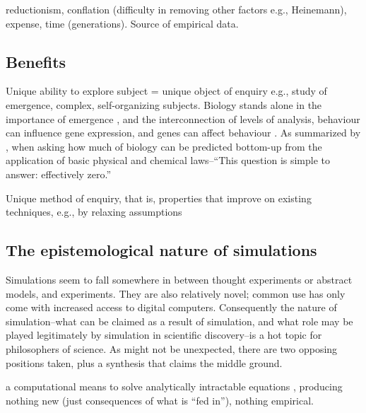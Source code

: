 reductionism, conflation (difficulty in removing other factors e.g.,
Heinemann), expense, time (generations). Source of empirical data.


\subsection{Benefits}\label{benefits}

Unique ability to explore subject = unique object of enquiry e.g., study
of emergence, complex, self-organizing subjects. Biology stands alone in
the importance of emergence \autocite{Bersini:2006ve}, and the
interconnection of levels of analysis, \eg behaviour can influence gene
expression, and genes can affect behaviour \autocite{Krakauer2011}. As
summarized by \autocite{Krakauer2011}, when asking how much of biology
can be predicted bottom-up from the application of basic physical and
chemical laws--``This question is simple to answer: effectively zero.''

Unique method of enquiry, that is, properties that improve on existing
techniques, e.g., by relaxing assumptions

\subsection{The epistemological nature of simulations}\label{the-epistemological-nature-of-simulations}

Simulations seem to fall somewhere in between thought experiments or
abstract models, and experiments. They are also relatively novel; common
use has only come with increased access to digital computers.
Consequently the nature of simulation--what can be claimed as a result
of simulation, and what role may be played legitimately by simulation in
scientific discovery--is a hot topic for philosophers of science. As
might not be unexpected, there are two opposing positions taken, plus a
synthesis that claims the middle ground.

\label{simulations-are-just-calculators}

a computational means to solve analytically intractable equations
\autocite[31]{Winsberg2010}, producing nothing new (just consequences
of what is ``fed in''\autocite{DiPaolo2000}), nothing empirical.

